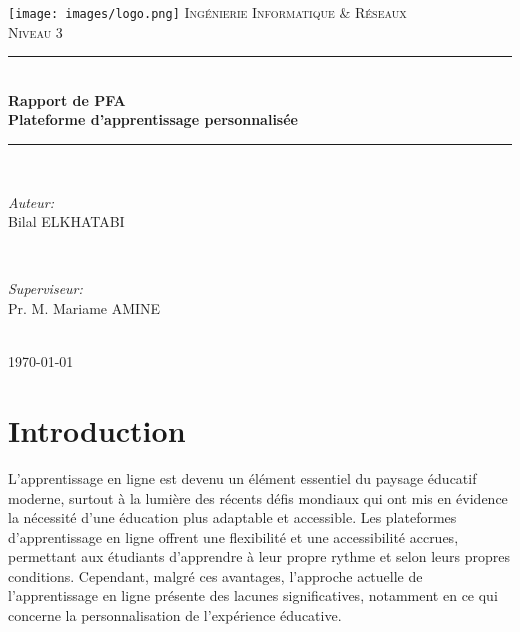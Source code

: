 




\pagestyle{fancy}
\fancyhf{}

\begin{titlepage}
\newcommand{\HRule}{\rule{\linewidth}{0.5mm}}
\centering
\texttt{[image: images/logo.png]} 
\vfill
\textsc{\LARGE Ingénierie Informatique \& Réseaux}\\[0.5cm]  
\textsc{\Large Niveau 3}\\[0.5cm] 
\HRule \\[0.4cm]
{ \huge \bfseries Rapport de PFA  \\
	 Plateforme d'apprentissage personnalisée}
\HRule \\[2cm]

\begin{minipage}{0.4\textwidth}	
\begin{flushleft} \large
\emph{Auteur:}\\
Bilal ELKHATABI
\end{flushleft}
\end{minipage}
~
\begin{minipage}{0.4\textwidth}
\begin{flushright} \large
\emph{Superviseur:} \\
Pr. M. Mariame AMINE
\end{flushright}
\end{minipage}\\[2cm]

{\large \today}\\[2cm] 
\nopagebreak
\end{titlepage}

\tableofcontents
\newpage


\part{Introduction}

L'apprentissage en ligne est devenu un élément essentiel du paysage éducatif moderne, surtout à la lumière des récents défis mondiaux qui ont mis en évidence la nécessité d'une éducation plus adaptable et accessible. Les plateformes d'apprentissage en ligne offrent une flexibilité et une accessibilité accrues, permettant aux étudiants d'apprendre à leur propre rythme et selon leurs propres conditions. Cependant, malgré ces avantages, l'approche actuelle de l'apprentissage en ligne présente des lacunes significatives, notamment en ce qui concerne la personnalisation de l'expérience éducative.

